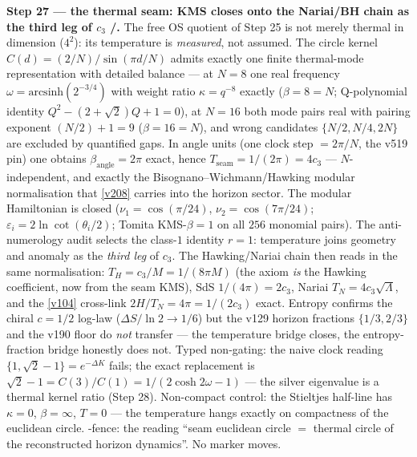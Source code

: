 \par\smallskip\noindent\textbf{Step 27 --- the thermal seam: KMS closes onto the Nariai/BH
chain as the third leg of $c_3$ \mE/\mC.} The free OS quotient of Step 25 is not merely
thermal in dimension ($4^2$): its temperature is \emph{measured}, not assumed. The circle
kernel $C(d)=(2/N)/\sin(\pi d/N)$ admits exactly one finite thermal-mode representation with
detailed balance --- at $N=8$ one real frequency $\omega=\mathrm{arcsinh}(2^{-3/4})$ with
weight ratio $\kappa=q^{-8}$ exactly ($\beta=8=N$; Q-polynomial identity
$Q^2-(2+\sqrt2)Q+1=0$), at $N=16$ both mode pairs real with pairing exponent
$(N/2)+1=9$ ($\beta=16=N$), and wrong candidates $\{N/2,N/4,2N\}$ are excluded by
quantified gaps. In angle units (one clock step $=2\pi/N$, the v519 pin) one obtains
$\beta_{\mathrm{angle}}=2\pi$ exact, hence $T_{\mathrm{seam}}=1/(2\pi)=4c_3$ ---
$N$-independent, and exactly the Bisognano--Wichmann/Hawking modular normalisation that
\vref{v208} carries into the horizon sector. The modular Hamiltonian is closed
($\nu_1=\cos(\pi/24)$, $\nu_2=\cos(7\pi/24)$; $\varepsilon_i=2\ln\cot(\theta_i/2)$;
Tomita KMS-$\beta=1$ on all $256$ monomial pairs). The anti-numerology audit selects the
class-$1$ identity $r=1$: temperature joins geometry and anomaly as the \emph{third leg}
of $c_3$. The Hawking/Nariai chain then reads in the same normalisation:
$T_H=c_3/M=1/(8\pi M)$ (the axiom \emph{is} the Hawking coefficient, now from the seam
KMS), SdS $1/(4\pi)=2c_3$, Nariai $T_N=4c_3\sqrt{\Lambda}$, and the \vref{v104}
cross-link $2H/T_N=4\pi=1/(2c_3)$ exact. Entropy confirms the chiral $c=1/2$ log-law
($\Delta S/\ln2\to1/6$) but the v129 horizon fractions $\{1/3,2/3\}$ and the v190 floor
do \emph{not} transfer --- the temperature bridge closes, the entropy-fraction bridge
honestly does not. Typed non-gating: the naive clock reading
$\{1,\sqrt2-1\}=e^{-\Delta K}$ fails; the exact replacement is
$\sqrt2-1=C(3)/C(1)=1/(2\cosh 2\omega-1)$ --- the silver eigenvalue is a thermal kernel
ratio (Step 28). Non-compact control: the Stieltjes half-line has $\kappa=0$,
$\beta=\infty$, $T=0$ --- the temperature hangs exactly on compactness of the euclidean
circle. \mC-fence: the reading ``seam euclidean circle $=$ thermal circle of the
reconstructed horizon dynamics''. No marker moves.

